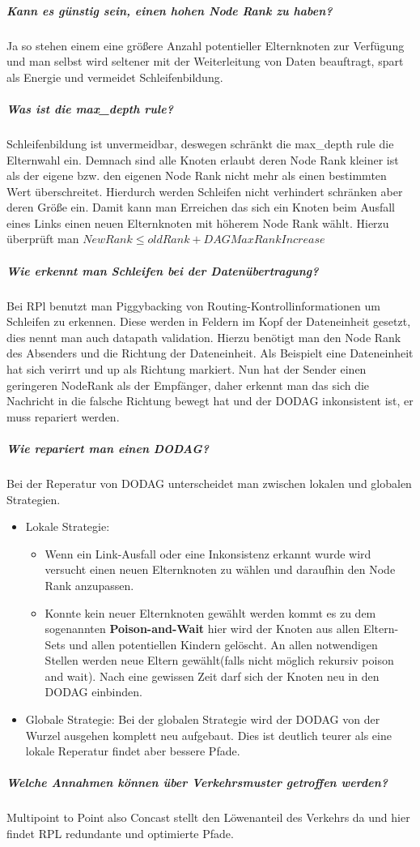 	\subparagraph{Kann es günstig sein, einen hohen Node Rank zu haben?}
	Ja so stehen einem eine größere Anzahl potentieller Elternknoten zur Verfügung und man selbst wird seltener mit der Weiterleitung von Daten beauftragt, spart als Energie und vermeidet Schleifenbildung.
	
	\subparagraph{Was ist die max\_depth rule?}
	Schleifenbildung ist unvermeidbar, deswegen schränkt die max\_depth rule die Elternwahl ein. Demnach sind alle Knoten erlaubt deren Node Rank kleiner ist als der eigene bzw. den eigenen Node Rank nicht mehr als einen bestimmten Wert überschreitet. Hierdurch werden Schleifen nicht verhindert schränken aber deren Größe ein. Damit kann man Erreichen das sich ein Knoten beim Ausfall eines Links einen neuen Elternknoten mit höherem Node Rank wählt.
	Hierzu überprüft man $NewRank \leq oldRank + DAGMaxRankIncrease$
	
	\subparagraph{Wie erkennt man Schleifen bei der Datenübertragung?}
	Bei RPl benutzt man Piggybacking von Routing-Kontrollinformationen um Schleifen zu erkennen. Diese werden in Feldern im Kopf der Dateneinheit gesetzt, dies nennt man auch datapath validation.
	Hierzu benötigt man den Node Rank des Absenders und die Richtung der Dateneinheit. Als Beispielt eine Dateneinheit hat sich verirrt und up als Richtung markiert. Nun hat der Sender einen geringeren NodeRank als der Empfänger, daher erkennt man das sich die Nachricht in die falsche Richtung bewegt hat und der DODAG inkonsistent ist, er muss repariert werden.
	
	\subparagraph{Wie repariert man einen DODAG?}
	Bei der Reperatur von DODAG unterscheidet man zwischen lokalen und globalen Strategien.
	\begin{itemize}
		\item Lokale Strategie: 
			\begin{itemize}
				\item Wenn ein Link-Ausfall oder eine Inkonsistenz erkannt wurde wird versucht einen neuen Elternknoten zu wählen und daraufhin den Node Rank anzupassen. 
				\item Konnte kein neuer Elternknoten gewählt werden kommt es zu dem sogenannten \textbf{Poison-and-Wait} hier wird der Knoten aus allen Eltern-Sets und allen potentiellen Kindern gelöscht. An allen notwendigen Stellen werden neue Eltern gewählt(falls nicht möglich rekursiv poison and wait). Nach eine gewissen Zeit darf sich der Knoten neu in den DODAG einbinden.
				\end{itemize}
				
		\item Globale Strategie: Bei der globalen Strategie wird der DODAG von der Wurzel ausgehen komplett neu aufgebaut. Dies ist deutlich teurer als eine lokale Reperatur findet aber bessere Pfade.
		\end{itemize}
		\subparagraph{Welche Annahmen können über Verkehrsmuster getroffen werden?}
		Multipoint to Point also Concast stellt den Löwenanteil des Verkehrs da und hier findet RPL redundante und optimierte Pfade.
		

